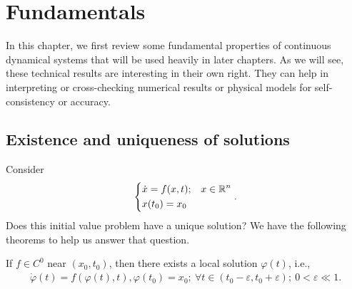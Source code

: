 \chapter{Fundamentals}
 In this chapter, we first review some fundamental properties of continuous dynamical systems that will be used heavily in later chapters. As we will see, these technical results are interesting in their own right. They can help in interpreting or cross-checking numerical results or physical models for self-consistency or accuracy.
\section{Existence and uniqueness of solutions}
Consider  
\begin{align}
\begin{dcases}
	\dot{ {x}} = f( {x},t); &  {x} \in \mathbb{R}^{n} \\
	 {x}(t_0) =  {x}_0
\end{dcases}.
\end{align}
Does this initial value problem have a unique solution? We have the following theorems to help us answer that question.
\begin{theorem}[Peano]
	\label{thm:Peano}
	If $f\in C^0$ near $( {x}_0, t_0)$, then there exists a local solution $\varphi(t)$, i.e., 
\begin{align}
	\dot{\varphi}(t) = f(\varphi(t), t), \varphi(t_0) = x_0;\ \forall  t\in (t_0 - \varepsilon, t_0 + \varepsilon);\ 0<  \varepsilon \ll 1.
\end{align}
\end{theorem}
